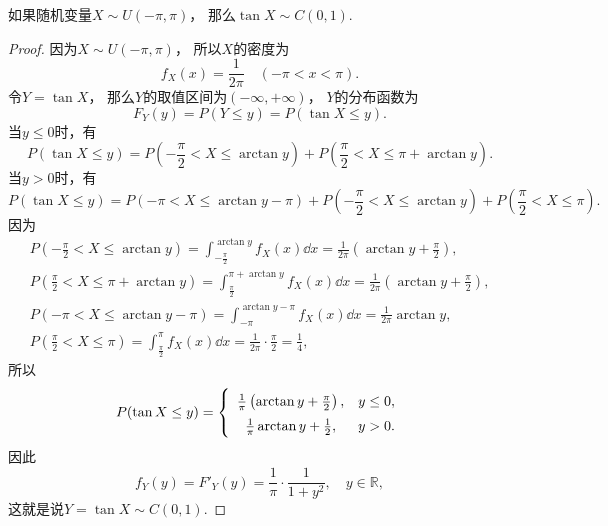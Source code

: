\begin{proposition}
如果随机变量\(X \sim U(-\pi,\pi)\)，
那么\(\tan X \sim C(0,1)\).
\begin{proof}
因为\(X \sim U(-\pi,\pi)\)，
所以\(X\)的密度为\begin{equation*}
	f_X(x) = \frac{1}{2\pi}
	\quad(-\pi<x<\pi).
\end{equation*}
令\(Y = \tan X\)，
那么\(Y\)的取值区间为\((-\infty,+\infty)\)，
\(Y\)的分布函数为\begin{equation*}
	F_Y(y)
	= P(Y \leq y)
	= P(\tan X \leq y).
\end{equation*}
当\(y\leq0\)时，有\begin{equation*}
	P(\tan X \leq y)
	= P\left(-\frac\pi2 < X \leq \arctan y\right)
	+ P\left(\frac\pi2 < X \leq \pi + \arctan y\right).
\end{equation*}
当\(y>0\)时，有\begin{equation*}
	P(\tan X \leq y)
	= P\left(-\pi < X \leq \arctan y - \pi\right)
	+ P\left(-\frac\pi2 < X \leq \arctan y\right)
	+ P\left(\frac\pi2 < X \leq \pi\right).
\end{equation*}
因为\begin{gather*}
	P\left(-\frac\pi2 < X \leq \arctan y\right)
	= \int_{-\frac\pi2}^{\arctan y} f_X(x) \dd{x}
	= \frac{1}{2\pi} \left(\arctan y + \frac\pi2\right), \\
	P\left(\frac\pi2 < X \leq \pi + \arctan y\right)
	= \int_{\frac\pi2}^{\pi + \arctan y} f_X(x) \dd{x}
	= \frac{1}{2\pi} \left(\arctan y + \frac\pi2\right), \\
	P\left(-\pi < X \leq \arctan y - \pi\right)
	= \int_{-\pi}^{\arctan y - \pi} f_X(x) \dd{x}
	= \frac{1}{2\pi} \arctan y, \\
	P\left(\frac\pi2 < X \leq \pi\right)
	= \int_{\frac\pi2}^\pi f_X(x) \dd{x}
	= \frac{1}{2\pi} \cdot \frac\pi2
	= \frac14,
\end{gather*}
所以\begin{equation*}
	P(\tan X \leq y)
	= \left\{ \def\arraystretch{1.5} \begin{array}{cl}
		\frac1\pi \left(\arctan y + \frac\pi2\right), & y\leq0, \\
		\frac1\pi \arctan y + \frac12, & y>0.
	\end{array} \right.
\end{equation*}
因此\begin{equation*}
	f_Y(y) = F'_Y(y)
	= \frac1\pi \cdot \frac{1}{1+y^2},
	\quad y\in\mathbb{R},
\end{equation*}
这就是说\(Y = \tan X \sim C(0,1)\).
\end{proof}
\end{proposition}

